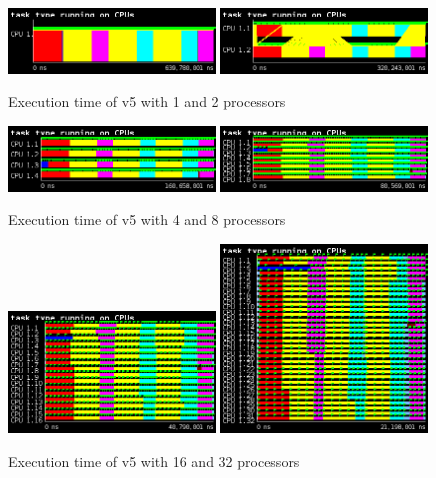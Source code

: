\begin{figure}[H]%
    \centering
    \includegraphics[width=0.49\textwidth]{./data/3dfft_/plots/v5_01.png}
    \includegraphics[width=0.49\textwidth]{./data/3dfft_/plots/v5_02.png}
    \caption{Execution time of v5 with 1 and 2 processors}%
    \label{fig:plot_v5_01}
\end{figure}

\begin{figure}[H]%
    \label{fig:plot_v5_04}
    \centering
    \includegraphics[width=0.49\textwidth]{./data/3dfft_/plots/v5_04.png}
    \includegraphics[width=0.49\textwidth]{./data/3dfft_/plots/v5_08.png}
    \caption{Execution time of v5 with 4 and 8 processors}%
\end{figure}

\begin{figure}[H]%
    \label{fig:plot_v5_16}
    \centering
    \includegraphics[width=0.49\textwidth]{./data/3dfft_/plots/v5_16.png}
    \includegraphics[width=0.49\textwidth]{./data/3dfft_/plots/v5_32.png}
    \caption{Execution time of v5 with 16 and 32 processors}%
\end{figure}


